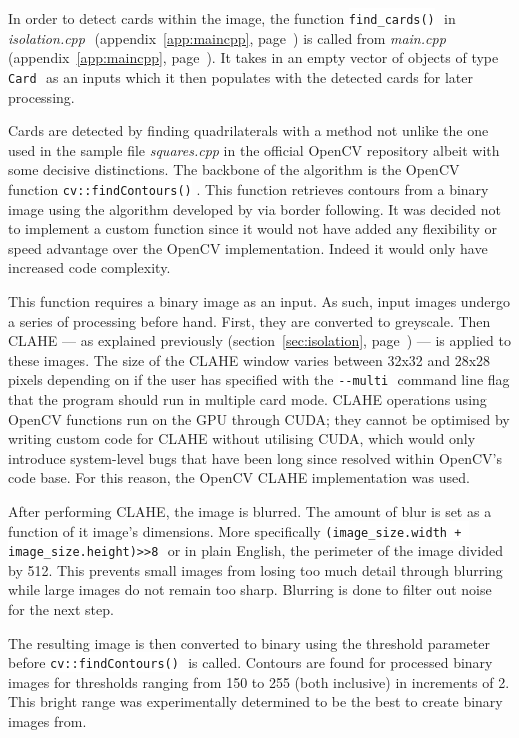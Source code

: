 \documentclass[a4paper,12pt,notitlepage]{article}
\newcommand{\source}[2]{\emph{#1 } (appendix~\ref{#2}, page~\pageref{#2})}
\newcommand{\secref}[1]{(section~\ref{#1}, page~\pageref{#1})}
\newcommand{\code}[1]{\colorbox{white}{\lstinline[basicstyle=\ttfamily\color{black}]|#1|} }
\begin{document}
			In order to detect cards within the image, the function \code{find_cards()} in \source{isolation.cpp}{app:maincpp} is called from \source{main.cpp}{app:maincpp}. It takes in an empty vector of objects of type \code{Card} as an inputs which it then populates with the detected cards for later processing.

			Cards are detected by finding quadrilaterals with a method not unlike the one used in the sample file \emph{squares.cpp} in the official OpenCV repository \autocite{squares} albeit with some decisive distinctions. The backbone of the algorithm is the OpenCV function \code{cv::findContours()}. This function retrieves contours from a binary image using the algorithm developed by \textcite{suzuki1985topological} via border following. It was decided not to implement a custom function since it would not have added any flexibility or speed advantage over the OpenCV implementation. Indeed it would only have increased code complexity.

			This function requires a binary image as an input. As such, input images undergo a series of processing before hand. First, they are converted to greyscale. Then CLAHE --- as explained previously \secref{sec:isolation} --- is applied to these images. The size of the CLAHE window varies between 32x32 and 28x28 pixels depending on if the user has specified with the \code{--multi} command line flag that the program should run in multiple card mode. CLAHE operations using OpenCV functions run on the GPU through CUDA; they cannot be optimised by writing custom code for CLAHE without utilising CUDA, which would only introduce system-level bugs that have been long since resolved within OpenCV's code base. For this reason, the OpenCV CLAHE implementation was used.


			After performing CLAHE, the image is blurred. The amount of blur is set as a function of it image's dimensions. More specifically \code{(image_size.width + image_size.height)>>8} or in plain English, the perimeter of the image divided by 512. This prevents small images from losing too much detail through blurring while large images do not remain too sharp. Blurring is done to filter out noise for the next step.

			The resulting image is then converted to binary using the threshold parameter before \code{cv::findContours()} is called. Contours are found for processed binary images for thresholds ranging from 150 to 255 (both inclusive) in increments of 2. This bright range was experimentally determined to be the best to create binary images from.
\end{document}
